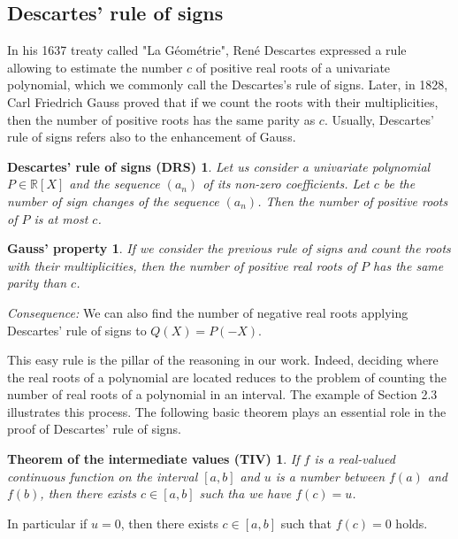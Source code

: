 \newtheorem*{drs}{Descartes' rule of signs (DRS)}
\newtheorem*{gp}{Gauss' property}
\newtheorem*{tiv}{Theorem of the intermediate values (TIV)}

\subsection{Descartes' rule of signs}

In his 1637 treaty called "La Géométrie", 
René Descartes expressed a rule allowing to estimate 
the number $c$ of positive real roots of a univariate 
polynomial, which we commonly call the Descartes's rule of signs. 
Later, in 1828, Carl Friedrich Gauss proved that if we count 
the roots with their multiplicities, then the number of positive roots 
has the same parity as $c$. 
Usually, Descartes' rule of signs  refers also to the enhancement of Gauss.

\begin{drs}
Let us consider a univariate polynomial $P\in\mathbb{R}[X]$ and the sequence 
$(a_n)$ of its non-zero coefficients. Let $c$ be the number of sign changes 
of the sequence $(a_n)$. Then the number of positive roots of $P$ is at most $c$.
\end{drs}


\begin{gp}
If we consider the previous rule of signs and 
count the roots with their multiplicities, 
then the number of positive real roots of $P$ 
has the same parity than $c$.
\end{gp}

\noindent \textit{Consequence:} We can also find the number of 
negative real roots applying Descartes' rule of signs to $Q(X) = P(-X)$.


This easy rule is the pillar of the reasoning in our work. 
Indeed, deciding where the real roots of a polynomial are located
reduces to the problem  of counting the number of real roots
of a polynomial in an interval.
The example of Section 2.3 illustrates this process.
The following basic theorem plays an essential role in the proof
of Descartes' rule of signs.


\begin{tiv}
If $f$ is a real-valued continuous function on the interval $[a, b]$ and $u$ is a number between $f(a)$ and $f(b)$, then there exists $c\in [a, b]$ such tha we have $f(c) = u$.
\end{tiv}


In particular if $u = 0$, then there  exists $c\in [a, b]$ such that $f(c) = 0$ holds.


